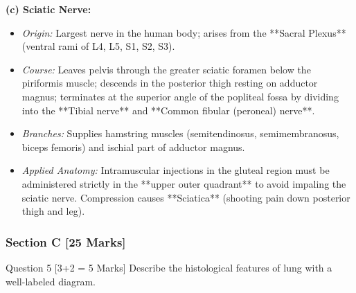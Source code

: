 \documentclass[11pt,a4paper]{article}
\begin{document}
\begin{ansbox}
\textbf{(c) Sciatic Nerve:}
\begin{itemize}[leftmargin=*]
    \item \textit{Origin:} Largest nerve in the human body; arises from the **Sacral Plexus** (ventral rami of L4, L5, S1, S2, S3).
    \item \textit{Course:} Leaves pelvis through the greater sciatic foramen below the piriformis muscle; descends in the posterior thigh resting on adductor magnus; terminates at the superior angle of the popliteal fossa by dividing into the **Tibial nerve** and **Common fibular (peroneal) nerve**.
    \item \textit{Branches:} Supplies hamstring muscles (semitendinosus, semimembranosus, biceps femoris) and ischial part of adductor magnus.
    \item \textit{Applied Anatomy:} Intramuscular injections in the gluteal region must be administered strictly in the **upper outer quadrant** to avoid impaling the sciatic nerve. Compression causes **Sciatica** (shooting pain down posterior thigh and leg).
\end{itemize}
\end{ansbox}

\subsubsection{Section C [25 Marks]}

\begin{qbox}{Question 5 [3+2 = 5 Marks]}
Describe the histological features of lung with a well-labeled diagram.
\end{qbox}
\end{document}
